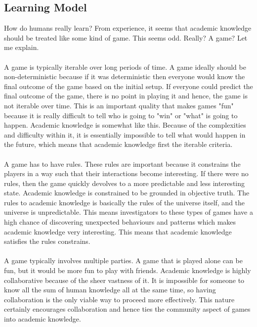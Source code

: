 \documentclass[a4paper, 12pt]{report}
\begin{document}
\begin{center}
\section{Learning Model}
\begin{comment}
\end{comment}
How do humans really learn? From experience, it seems that academic knowledge should be treated like some kind of game. 
This seems odd. Really? A game? Let me explain. 
\\~\\A game is typically iterable over long periods of time. 
A game ideally should be non-deterministic because if it was deterministic then everyone would know the final outcome of the game based on the initial setup.
If everyone could predict the final outcome of the game, there is no point in playing it and hence, the game is not iterable over time.
This is an important quality that makes games "fun" because it is really difficult to tell who is going to "win" or "what" is going to happen. 
Academic knowledge is somewhat like this. 
Because of the complexities and difficulty within it, it is essentially impossible to tell what would happen in the future, which means that academic knowledge first the iterable criteria.
\\~\\A game has to have rules. These rules are important because it constrains the players in a way such that their interactions become interesting. If there were no rules, then the game quickly devolves to a more predictable and less interesting state. Academic knowledge is constrained to be grounded in objective truth. The rules to academic knowledge is basically the rules of the universe itself, and the universe is unpredictable.
This means investigators to these types of games have a high chance of discovering unexpected behaviours and patterns which makes academic knowledge very interesting.
This means that academic knowledge satisfies the rules constrains.
\\~\\A game typically involves multiple parties. A game that is played alone can be fun, but it would be more fun to play with friends.
Academic knowledge is highly collaborative because of the sheer vastness of it. It is impossible for someone to know all the sum of human knowledge all at the same time, so having collaboration is the only viable way to proceed more effectively. This nature certainly encourages collaboration and hence ties the community aspect of games into academic knowledge.


\end{center}
\end{document}

